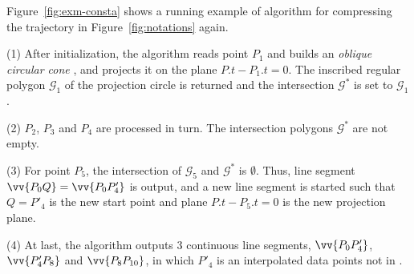 \begin{example}
\label{exm-alg-conesta}
Figure~\ref{fig:exm-consta}  shows a running example of algorithm \cista for compressing the trajectory  in Figure~\ref{fig:notations} again.


\sstab (1) After initialization, the \cista algorithm reads point $P_1$ and builds an \emph{oblique circular cone} , and projects it on the plane $P.t-P_1.t=0$. The inscribed regular polygon $\mathcal{G}_1$ of the projection circle is returned and the intersection $\mathcal{G}^*$ is set to $\mathcal{G}_1$.

\sstab (2) $P_2$, $P_3$ and $P_4$ are processed in turn. The intersection polygons $\mathcal{G}^*$ are not empty.

\sstab (3) For point $P_5$, the intersection of $\mathcal{G}_5$ and $\mathcal{G}^*$ is $\emptyset$. Thus, line segment $\vv{P_0Q} =\vv{P_0P'_4}$ is output, and a new line segment is started such that $Q=P'_4$ is the new start point and plane $P.t-P_5.t=0$ is the new projection plane.

\sstab (4) At last, the algorithm outputs 3 continuous line segments, \ie $\vv{P_0P'_4}$, $\vv{P'_4P_8}$ and $\vv{P_8P_{10}}$, in which $P'_4$ is an interpolated data points not in .
\end{example}








